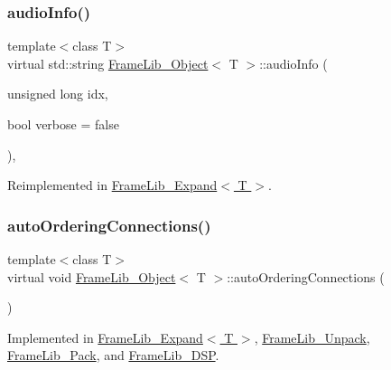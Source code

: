 \subsubsection{\texorpdfstring{audio\+Info()}{audioInfo()}}
{\footnotesize\ttfamily template$<$class T$>$ \\
virtual std\+::string \hyperlink{class_frame_lib___object}{Frame\+Lib\+\_\+\+Object}$<$ T $>$\+::audio\+Info (\begin{DoxyParamCaption}\item[{unsigned long}]{idx,  }\item[{bool}]{verbose = {\ttfamily false} }\end{DoxyParamCaption})\hspace{0.3cm}{\ttfamily [inline]}, {\ttfamily [virtual]}}



Reimplemented in \hyperlink{class_frame_lib___expand_a94ab97ff114452551719fad428fd2d6e}{Frame\+Lib\+\_\+\+Expand$<$ T $>$}.

\mbox{\label{class_frame_lib___object_afa5bb93302a641c23b5eac7ab0dfe516}} 
\subsubsection{\texorpdfstring{auto\+Ordering\+Connections()}{autoOrderingConnections()}}
{\footnotesize\ttfamily template$<$class T$>$ \\
virtual void \hyperlink{class_frame_lib___object}{Frame\+Lib\+\_\+\+Object}$<$ T $>$\+::auto\+Ordering\+Connections (\begin{DoxyParamCaption}{ }\end{DoxyParamCaption})\hspace{0.3cm}{\ttfamily [pure virtual]}}



Implemented in \hyperlink{class_frame_lib___expand_ab3f908391944bd2d6f5492cc67c19cba}{Frame\+Lib\+\_\+\+Expand$<$ T $>$}, \hyperlink{class_frame_lib___unpack_a4bbf83c7d4bd8c96acd2283afa0ed2c2}{Frame\+Lib\+\_\+\+Unpack}, \hyperlink{class_frame_lib___pack_aacf276d3ed114e4aa03b8e640164d116}{Frame\+Lib\+\_\+\+Pack}, and \hyperlink{class_frame_lib___d_s_p_a8dfb9b1855cc6a829acc1a03dcc4776b}{Frame\+Lib\+\_\+\+D\+SP}.

